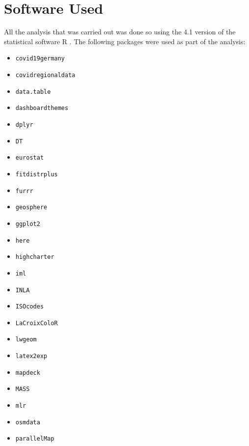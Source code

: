 \section{Software Used}
All the analysis that was carried out was done so using the 4.1 version of the statistical software R \autocite[][]{baser}. The following packages were used as part of the analysis:
\begin{itemize}
    \item \texttt{covid19germany} \autocite[][]{covid19germany}
    \item \texttt{covidregionaldata} \autocite[][]{covidregionaldata}
    \item \texttt{data.table} \autocite[][]{data.table}
    \item \texttt{dashboardthemes} \autocite[][]{dashboardthemes}
    \item \texttt{dplyr} \autocite[][]{dplyr}
    \item \texttt{DT} \autocite[][]{DT}
    \item \texttt{eurostat} \autocite[][]{eurostat}
    \item \texttt{fitdistrplus} \autocite[][]{fitdistrplus}
    \item \texttt{furrr} \autocite[][]{furrr}
    \item \texttt{geosphere} \autocite[][]{geosphere}
    \item \texttt{ggplot2} \autocite[][]{ggplot2}
    \item \texttt{here} \autocite[][]{here}
    \item \texttt{highcharter} \autocite[][]{highcharter}
    \item \texttt{iml} \autocite[][]{iml}
    \item \texttt{INLA} \autocite[][]{INLA}
    \item \texttt{ISOcodes} \autocite[][]{ISOcodes}
    \item \texttt{LaCroixColoR} \autocite[][]{LaCroixColoR}
    \item \texttt{lwgeom} \autocite[][]{lwgeom}
    \item \texttt{latex2exp} \autocite[][]{latex2exp}
    \item \texttt{mapdeck} \autocite[][]{mapdeck}
    \item \texttt{MASS} \autocite[][]{MASS}
    \item \texttt{mlr} \autocite[][]{mlr}
    \item \texttt{osmdata} \autocite[][]{osmdata}
    \item \texttt{parallelMap} \autocite[][]{parallelMap}

\end{itemize}
